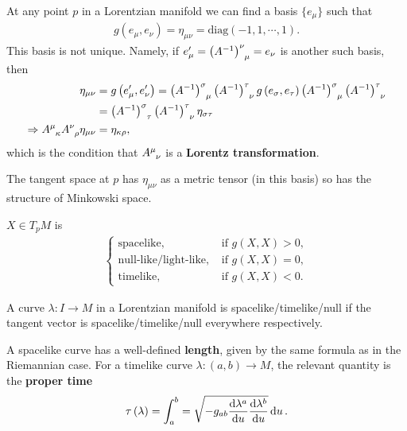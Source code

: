 At any point $p$ in a Lorentzian manifold we can find a basis $\{e_\mu\} $ such that
\begin{align}
    g \left( e_\mu, e_\nu \right) = \eta_{\mu \nu} = \text{diag} \left( -1, 1,\cdots,1 \right) 
.\end{align}
This basis is not unique. Namely, if $e_{\mu}' = \tensor{\left( A^{-1} \right)}{^{\nu}_{\mu}} = e_{\nu}$ is another such basis, then
\begin{align}
    \eta_{\mu \nu} &= g\left( e_{\mu}' , e_{\nu}' \right) = \tensor{\left( A^{-1} \right)}{^{\sigma}_{\mu}} \tensor{\left( A^{-1} \right)}{^{\tau}_{\nu}} g \left( e_{\sigma}, e_{\tau} \right)  \tensor{\left( A^{-1} \right)}{^{\sigma}_{\mu}} \tensor{\left( A^{-1} \right)}{^{\tau}_{\nu}} \\
    &=  \tensor{\left( A^{-1} \right) }{^{\sigma}_\tau} \tensor{\left( A^{-1} \right) }{^{\tau}_\nu} \eta_{\sigma \tau}\\
    \implies \tensor{A}{^{\mu}_{\kappa}} \tensor{A}{^{\nu}_\rho} \eta_{\mu \nu} &= \eta_{\kappa \rho}
,\end{align}
which is the condition that $\tensor{A}{^{\mu}_\nu}$ is a \textbf{Lorentz transformation}.

The tangent space at $p$ has $\eta_{\mu \nu}$ as a metric tensor (in this basis) so has the structure of Minkowski space.

\begin{definition}
    $X \in T_p M $ is 
    \begin{align}
        \begin{cases}
            \text{spacelike}, & \text{~if $g\left( X,X \right) > 0$},\\
            \text{null-like/light-like}, & \text{~if $g\left( X,X \right) = 0$},\\
            \text{timelike}, & \text{~if $g\left( X,X \right) < 0$}.
        \end{cases}
    \end{align}
\end{definition}


A curve $\lambda : I \to M$ in a Lorentzian manifold is spacelike/timelike/null if the tangent vector is spacelike/timelike/null everywhere respectively.

A spacelike curve has a well-defined \textbf{length}, given by the same formula as in the Riemannian case. For a timelike curve $\lambda : \left( a,b \right) \to M$, the relevant quantity is the \textbf{proper time}
\begin{align}
    \tau \left( \lambda \right) = \int_a^{b} = \sqrt{-g_{ab} \dv{\lambda^{a}}{u} \dv{\lambda^{b}}{u}} \dd{u} 
.\end{align}

